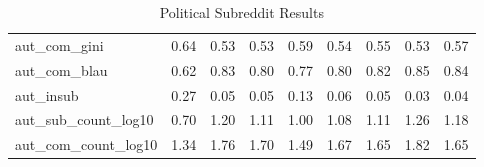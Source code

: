 \begin{table}
\begin{tabular}{lllllllll}
aut\_com\_gini        &       0.64 &        0.53 &         0.53 &     0.59 &         0.54 &      0.55 &                0.53 &                0.57 \\
aut\_com\_blau        &       0.62 &        0.83 &         0.80 &     0.77 &         0.80 &      0.82 &                0.85 &                0.84 \\
aut\_insub           &       0.27 &        0.05 &         0.05 &     0.13 &         0.06 &      0.05 &                0.03 &                0.04 \\
aut\_sub\_count\_log10 &       0.70 &        1.20 &         1.11 &     1.00 &         1.08 &      1.11 &                1.26 &                1.18 \\
aut\_com\_count\_log10 &       1.34 &        1.76 &         1.70 &     1.49 &         1.67 &      1.65 &                1.82 &                1.65 \\
\bottomrule
\end{tabular}
\caption{Political Subreddit Results}
\label{table/pol}
\end{table}